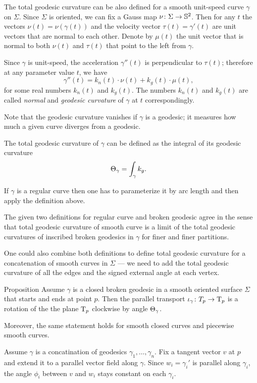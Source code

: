 The total geodesic curvature can be also defined for a smooth unit-speed curve $\gamma$ on $\Sigma$.
Since $\Sigma$ is oriented, we can fix a Gauss map $\nu\colon\Sigma\to \mathbb{S}^2$.
Then for any $t$ the vectors $\nu(t)=\nu(\gamma(t))$ and the velocity vector $\tau(t)=\gamma'(t)$ are unit vectors that are normal to each other.
Denote by $\mu(t)$ the unit vector that is normal to both $\nu(t)$ and $\tau(t)$ that point to the left from $\gamma$.

Since $\gamma$ is unit-speed, the acceleration $\gamma''(t)$ is perpendicular to $\tau(t)$;
therefore at any parameter value $t$, we have
\[\gamma''(t)=k_n(t)\cdot \nu(t)+k_g(t)\cdot \mu(t),\]
for some real numbers $k_n(t)$ and $k_g(t)$.
The numbers $k_n(t)$ and $k_g(t)$ are called \emph{normal} and \emph{geodesic curvature} of $\gamma$ at $t$ correspondingly.

Note that the geodesic curvature vanishes if $\gamma$ is a geodesic; 
it measures how much a given curve diverges from a geodesic.

The total geodesic curvature of $\gamma$ can be defined as the integral of its geodesic curvature
\[\Theta_{\gamma}=\int_\gamma k_g.\]

If $\gamma$ is a regular curve then one has to parameterize it by arc length and then apply the definition above.

The given two definitions for regular curve and broken geodesic agree in the sense that total geodesic curvature of smooth curve is a limit of the total geodesic curvatures of inscribed broken geodesics in $\gamma$ for finer and finer partitions.

One could also combine both definitions to define total geodesic curvature for a concatenation of smooth curves in $\Sigma$ --- we need to add the total geodesic curvature of all the edges and the signed external angle at each vertex. 


\begin{thm}{Proposition}
Assume $\gamma$ is a closed broken geodesic in a smooth oriented surface $\Sigma$ that starts and ends at point $p$.
Then the parallel transport $\iota_\gamma\colon T_p\to\mathrm{T}_p$ is a rotation of the the plane $\mathrm{T}_p$ clockwise by angle $\Theta_{\gamma}$.

Moreover, the same statement holds for smooth closed curves and piecewise smooth curves.
\end{thm}

Assume $\gamma$ is a concatination of geodesics $\gamma_1,\dots,\gamma_n$.
Fix a tangent vector $v$ at $p$ and extend it to a parallel vector field along $\gamma$.
Since $w_i=\gamma_i'$ is parallel along $\gamma_i$, the angle $\phi_i$ between $v$ and $w_i$ stays constant on each $\gamma_i$.


